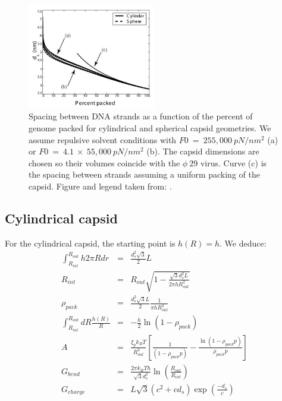 \documentclass{article}
\begin{document}
\begin{figure}[H]
    \centering
    \includegraphics[width=0.5\textwidth,height=0.4\textwidth]{ds_vs_packing_ratio.png}
    \caption{Spacing between DNA strands as a function of the percent of genome packed for cylindrical and spherical capsid geometries. We assume repulsive solvent conditions with $F0~=~255,000~pN/nm^2$ (a) or $F0~=~4.1~\times~55,000~pN/nm^2$ (b). The capsid dimensions are chosen so their volumes coincide with the $\phi~29$ virus. Curve (c) is the spacing between strands assuming a uniform packing of the capsid. Figure and legend taken from: \cite{purohit2003}.}
    \label{fig:enter-label}
\end{figure}

\subsection{Cylindrical capsid}

For the cylindrical capsid, the starting point is $h(R) = h$.
We deduce:
\begin{eqnarray}
    \int_{R_{int}}^{R_{out}} h 2 \pi R dr &=& \frac{d_s^2 \sqrt{3}}{2}L \\
    R_{int} &=& R_{out} \sqrt{1 - \frac{\sqrt{3}d_s^2L}{2 \pi h R_{out}^2}} \\
    \rho_{pack} &=& \frac{d_s^2 \sqrt{3} L}{2} \frac{1}{\pi h R_{out}^2} \\
    \int_{R_{int}}^{R_{out}} dR \frac{h(R)}{R} & = & -\frac{h}{2} \ln \left( 1-\rho_{pack}\right) \\
    A & = &\frac{\xi_p k_B T}{R_{out}^2} \left[ \frac{1}{ \left( 1 - \rho_{pack} p\right)} - \frac{\ln \left( 1-\rho_{pack}p \right) }{\rho_{pack} p} \right] \\
    G_{bend} &=& \frac{2 \pi k_B T h}{\sqrt{3} d_s^2} \ln \left( \frac{R_{out}}{R_{int}} \right) \\
    G_{charge} &=& L \sqrt{3} \left( c^2 + c d_s \right) \exp \left( \frac{-d_s}{c} \right)
\end{eqnarray}
\end{document}
